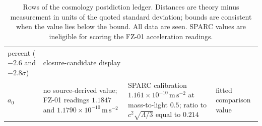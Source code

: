 \documentclass[11pt]{article}
\begin{document}
\begin{table}[t]
\begin{tabularx}{\textwidth}{@{}l>{\raggedright\arraybackslash}p{}>{\raggedright\arraybackslash}X>{\raggedright\arraybackslash}p{}@{}}
percent (\(-2.6\) and \(-2.8\sigma\)) &
closure-candidate display \\
\(a_0\) & no source-derived value; FZ-01 readings \(1.1847\) and
\(1.1790\times10^{-10}\,\mathrm{m\,s^{-2}}\) &
SPARC calibration \(1.161\times10^{-10}\,\mathrm{m\,s^{-2}}\) at
mass-to-light \(0.5\); ratio to \(c^2\sqrt{\Lambda/3}\) equal to \(0.214\) &
fitted comparison value \\
\bottomrule
\end{tabularx}
\caption{Rows of the cosmology postdiction ledger. Distances are theory
minus measurement in units of the quoted standard deviation; bounds are
consistent when the value lies below the bound. All data are seen. SPARC
values are ineligible for scoring the FZ-01 acceleration readings.}
\label{tab:ledger}
\end{table}
\end{document}
